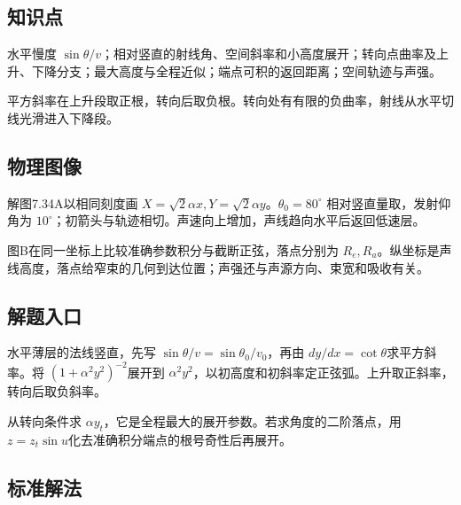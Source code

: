\documentclass[UTF8,fontset=fandol,a4paper,11pt]{ctexart}
\begin{document}
\subsection*{知识点}

水平慢度 $\sin\theta/v$；相对竖直的射线角、空间斜率和小高度展开；转向点曲率及上升、下降分支；最大高度与全程近似；端点可积的返回距离；空间轨迹与声强。

平方斜率在上升段取正根，转向后取负根。转向处有有限的负曲率，射线从水平切线光滑进入下降段。




\subsection*{物理图像}

解图7.34A以相同刻度画 $X=\sqrt2\alpha x,Y=\sqrt2\alpha y$。$\theta_0=80^\circ$ 相对竖直量取，发射仰角为 $10^\circ$；初箭头与轨迹相切。声速向上增加，声线趋向水平后返回低速层。

图B在同一坐标上比较准确参数积分与截断正弦，落点分别为 $R_e,R_a$。纵坐标是声线高度，落点给窄束的几何到达位置；声强还与声源方向、束宽和吸收有关。




\subsection*{解题入口}

水平薄层的法线竖直，先写 $\sin\theta/v=\sin\theta_0/v_0$，再由 $dy/dx=\cot\theta$求平方斜率。将 $(1+\alpha^2y^2)^{-2}$展开到 $\alpha^2y^2$，以初高度和初斜率定正弦弧。上升取正斜率，转向后取负斜率。

从转向条件求 $\alpha y_t$，它是全程最大的展开参数。若求角度的二阶落点，用 $z=z_t\sin u$化去准确积分端点的根号奇性后再展开。



\subsection*{标准解法}
\end{document}
